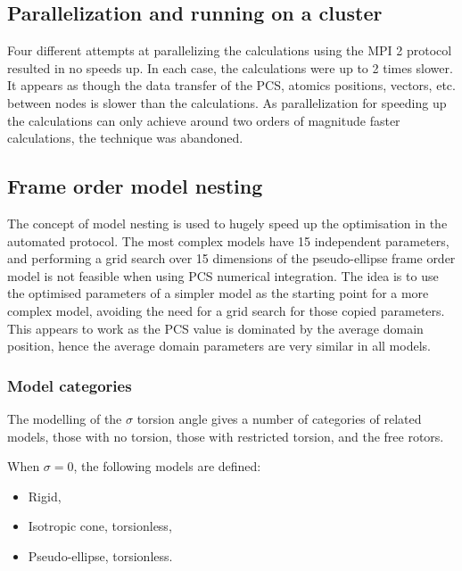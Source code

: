 
\subsection{Parallelization and running on a cluster}

Four different attempts at parallelizing the calculations using the MPI 2 protocol resulted in no speeds up.
In each case, the calculations were up to 2 times slower.
It appears as though the data transfer of the PCS, atomics positions, vectors, etc. between nodes is slower than the calculations.
As parallelization for speeding up the calculations can only achieve around two orders of magnitude faster calculations, the technique was abandoned.





\subsection{Frame order model nesting}

The concept of model nesting is used to hugely speed up the optimisation in the automated protocol.
The most complex models have 15 independent parameters, and performing a grid search over 15 dimensions of the pseudo-ellipse frame order model is not feasible when using PCS numerical integration.
The idea is to use the optimised parameters of a simpler model as the starting point for a more complex model, avoiding the need for a grid search for those copied parameters.
This appears to work as the PCS value is dominated by the average domain position, hence the average domain parameters are very similar in all models.


\subsubsection{Model categories}

The modelling of the $\sigma$ torsion angle gives a number of categories of related models, those with no torsion, those with restricted torsion, and the free rotors.



When $\sigma = 0$, the following models are defined:
\begin{itemize}
    \item Rigid,
    \item Isotropic cone, torsionless,
    \item Pseudo-ellipse, torsionless.
\end{itemize}


